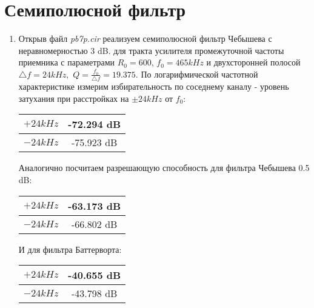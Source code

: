 \documentclass[a4paper, 12pt]{article}%
\begin{document}
\section{Семиполюсной фильтр}

\begin{enumerate}

\item Открыв файл \textit{pb7p.cir} реализуем семиполюсной фильтр Чебышева с неравномерностью 3 dB. для тракта усилителя промежуточной частоты приемника с параметрами $R_0 = 600$, $f_0 = 465 kHz$ и двухсторонней полосой $\bigtriangleup f = 24 kHz,$ $Q = \frac{f_0}{\bigtriangleup f} = 19.375$. По логарифмической частотной характеристике измерим избирательность по соседнему каналу - уровень затухания при расстройках на $\pm 24 kHz$ от $f_0$:

\begin{center}
\begin{tabular}{|c|c|}
\hline 
$+24 kHz$ & -72.294 dB \\ 
\hline 
$-24 kHz$ & -75.923 dB \\ 
\hline 
\end{tabular} 
\end{center}

Аналогично посчитаем разрешающую способность для фильтра Чебышева 0.5 dB:

\begin{center}
\begin{tabular}{|c|c|}
\hline 
$+24 kHz$ & -63.173 dB \\ 
\hline 
$-24 kHz$ & -66.802 dB \\ 
\hline 
\end{tabular} 
\end{center}

И для фильтра Баттерворта:

\begin{center}
\begin{tabular}{|c|c|}
\hline 
$+24 kHz$ & -40.655 dB \\ 
\hline 
$-24 kHz$ & -43.798 dB \\ 
\hline 
\end{tabular} 
\end{center}

\end{enumerate}
\end{document}
